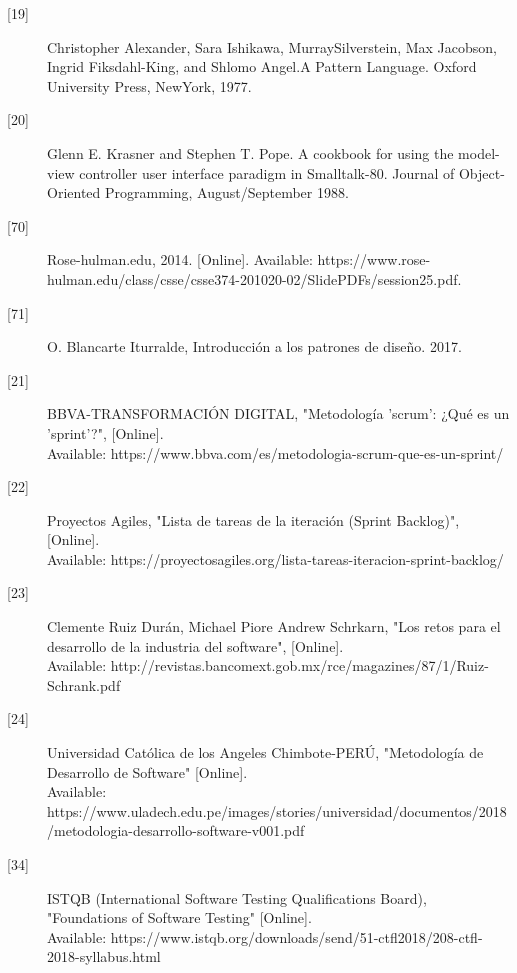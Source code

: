 \begin{description}
		\item[\hypertarget{b19}{[19]}] Christopher Alexander, Sara Ishikawa, MurraySilverstein, Max Jacobson,
		Ingrid Fiksdahl-King, and Shlomo Angel.A Pattern Language. Oxford University
		Press, NewYork, 1977.
		
		\item[\hypertarget{b20}{[20]}] Glenn E. Krasner and Stephen T. Pope. A cookbook for using the model-view
		controller user interface paradigm in Smalltalk-80. Journal of Object-Oriented Programming, August/September 1988.
		
		\item[\hypertarget{b70}{[70]}]Rose-hulman.edu, 2014. [Online]. Available: https://www.rose-hulman.edu/class/csse/csse374-201020-02/SlidePDFs/session25.pdf. 
		
		\item[\hypertarget{b71}{[71]}] O. Blancarte Iturralde, Introducción a los patrones de diseño. 2017.
		
		\item[\hypertarget{b21}{[21]}] BBVA-TRANSFORMACIÓN DIGITAL, "Metodología 'scrum': ¿Qué es un 'sprint'?", [Online].\\ Available: https://www.bbva.com/es/metodologia-scrum-que-es-un-sprint/
		
		\item[\hypertarget{b22}{[22]}] Proyectos Agiles, "Lista de tareas de la iteración (Sprint Backlog)", [Online].\\ Available: https://proyectosagiles.org/lista-tareas-iteracion-sprint-backlog/
		
		\item[\hypertarget{b23}{[23]}] Clemente Ruiz Durán, Michael Piore
		Andrew Schrkarn, "Los retos para el desarrollo
		de la industria del software", [Online].\\ Available: http://revistas.bancomext.gob.mx/rce/magazines/87/1/Ruiz-Schrank.pdf

		\item[\hypertarget{b24}{[24]}] Universidad Católica de los Angeles Chimbote-PERÚ, "Metodología de Desarrollo de Software"  [Online].\\ Available: https://www.uladech.edu.pe/images/stories/universidad/documentos/2018/metodologia-desarrollo-software-v001.pdf
		
		\item[\hypertarget{b34}{[34]}] ISTQB (International Software Testing Qualifications Board), "Foundations of Software Testing" [Online].\\ Available: 
		https://www.istqb.org/downloads/send/51-ctfl2018/208-ctfl-2018-syllabus.html
		

\end{description}
